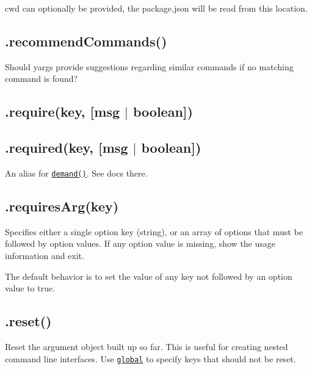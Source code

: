 {\ttfamily cwd} can optionally be provided, the package.\+json will be read from this location.

\subsection*{.recommend\+Commands() }

Should yargs provide suggestions regarding similar commands if no matching command is found?

\subsection*{.require(key, \mbox{[}msg $\vert$ boolean\mbox{]}) }

\subsection*{.required(key, \mbox{[}msg $\vert$ boolean\mbox{]}) }

An alias for \href{#demand}{\tt {\ttfamily demand()}}. See docs there.

\subsection*{\label{_requiresArg}%
.requires\+Arg(key) }

Specifies either a single option key (string), or an array of options that must be followed by option values. If any option value is missing, show the usage information and exit.

The default behavior is to set the value of any key not followed by an option value to {\ttfamily true}.

\subsection*{\label{_reset}%
.reset() }

Reset the argument object built up so far. This is useful for creating nested command line interfaces. Use \href{#global}{\tt global} to specify keys that should not be reset.




